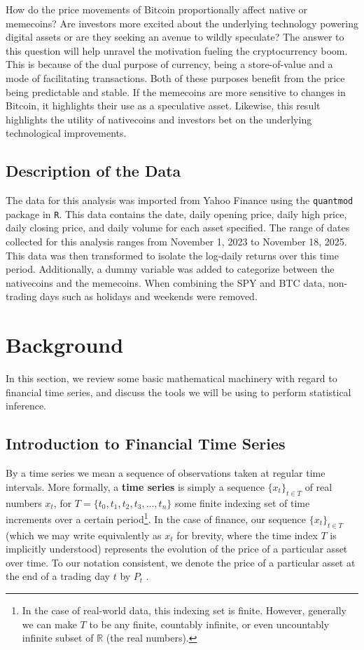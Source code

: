 \documentclass[12pt]{article}
\begin{document}
	How do the price movements of Bitcoin proportionally affect native or memecoins? Are investors more excited about the underlying technology powering
	digital assets or are they seeking an avenue to wildly speculate? The answer to this question will help unravel the motivation fueling the
	cryptocurrency boom. This is because of the dual purpose of currency, being a store-of-value and a mode of facilitating transactions. 
	Both of these purposes benefit from the price being predictable and stable. If the memecoins are more sensitive to changes in Bitcoin, 
	it highlights their use as a speculative asset. Likewise, this result highlights the utility of nativecoins and investors bet on the 
	underlying technological improvements. 
	
	\subsection{Description of the Data}
	
	The data for this analysis was imported from Yahoo Finance using the \texttt{quantmod} package in \texttt{R}. This data contains the date, daily opening price, daily high 
	price, daily closing price, and daily volume for each asset specified. The range of dates collected for this analysis ranges from November 1, 2023
	to November 18, 2025. This data was then transformed to isolate the log-daily returns over this time period. Additionally, a dummy variable was
	added to categorize between the nativecoins and the memecoins. When combining the SPY and BTC data, non-trading days such as holidays and
	weekends were removed. 
	
	\section{Background}
	In this section, we review some basic mathematical machinery with regard to financial time series, and discuss the tools we will be using to perform statistical inference. 
	\subsection{Introduction to Financial Time Series}
	By a time series we mean a sequence of observations taken at regular time intervals. More formally, a \textbf{time series}  is simply a sequence $\{x_t\}_{t \in T}$ of real numbers $x_t$, for $T = \{t_0, t_1, t_2, t_3, \dots, t_n\}$ some finite indexing set of time increments over a certain period\footnote{In the case of real-world data, this indexing set is finite. However, generally we can make $T$ to be any finite, countably infinite, or even uncountably infinite subset of $\mathbb{R}$ (the real numbers).}. In the case of finance, our sequence $\{x_t\}_{t \in T}$ (which we may write equivalently as $x_t$ for brevity, where the time index $T$ is implicitly understood) represents the evolution of the price of a particular asset over time.  To our notation consistent, we denote the price of a particular asset at the end of a trading day $t$ by $P_t$ . 
	
\end{document}
